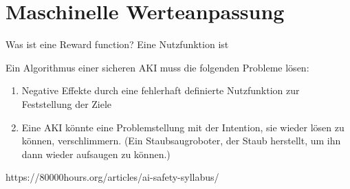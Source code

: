 \chapter{Maschinelle Werteanpassung}

Was ist eine Reward function?
Eine Nutzfunktion ist 


Ein Algorithmus einer sicheren AKI muss die folgenden Probleme lösen:
\begin{enumerate}
\item Negative Effekte durch eine fehlerhaft definierte Nutzfunktion zur Feststellung der Ziele
\item Eine AKI könnte eine Problemstellung mit der Intention, sie wieder lösen zu können, verschlimmern. (Ein Staubsaugroboter, der Staub herstellt, um ihn dann wieder aufsaugen zu können.) 
\end{enumerate}

https://80000hours.org/articles/ai-safety-syllabus/
%



